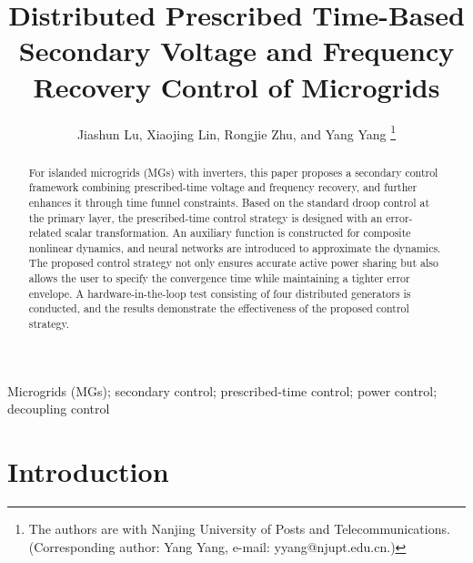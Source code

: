 \documentclass[]{interact}
\theoremstyle{plain}%
\theoremstyle{definition}
\theoremstyle{remark}
\begin{document}


\title{Distributed Prescribed Time-Based Secondary Voltage and Frequency Recovery Control of Microgrids}

\author{Jiashun Lu, Xiaojing Lin, Rongjie Zhu, and Yang Yang 
\thanks
{The authors are with Nanjing University of Posts and Telecommunications. (Corresponding author: Yang Yang, e-mail: yyang@njupt.edu.cn.)}}

\maketitle

\begin{abstract}
For islanded microgrids (MGs) with inverters, this paper proposes a secondary control framework combining prescribed-time voltage and frequency recovery, and further enhances it through time funnel constraints. 
Based on the standard droop control at the primary layer, the prescribed-time control strategy is designed with an error-related scalar transformation. 
An auxiliary function is constructed for composite nonlinear dynamics, and neural networks are introduced to approximate the dynamics. 
The proposed control strategy not only ensures accurate active power sharing but also allows the user to specify the convergence time while maintaining a tighter error envelope. 
A hardware-in-the-loop test consisting of four distributed generators is conducted, and the results demonstrate the effectiveness of the proposed control strategy.  
\end{abstract}

\begin{keywords}
Microgrids (MGs); secondary control; prescribed-time control; power control; decoupling control
\end{keywords}

\section{Introduction}
\end{document}
